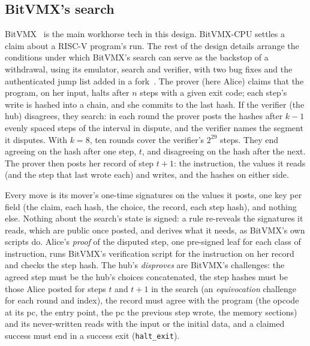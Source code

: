 \documentclass[11pt]{article}
\newcommand{\tx}[1]{\texttt{#1}}
\begin{document}
\subsection{BitVMX's search}
\label{sec:search}

BitVMX~\cite{bitvmx} is the main workhorse tech in this design. BitVMX-CPU settles a claim about a RISC-V program's run. The rest of the design details arrange the conditions
under which BitVMX's search can serve as the backstop of a withdrawal,
using its emulator, search and verifier, with two bug fixes and the authenticated jump list added in a fork~\cite{bitvmxcpu,bitvmxfork}. The prover (here Alice) claims that the program, on her input, halts
after $n$ steps with a given exit code; each step's write is hashed into
a chain, and she commits to the last hash. If the verifier (the hub)
disagrees, they search: in each round the prover posts the hashes after
$k - 1$ evenly spaced steps of the interval in dispute, and the verifier
names the segment it disputes. With $k = 8$, ten rounds cover the
verifier's $2^{29}$ steps. They end agreeing on the hash after one step,
$t$, and disagreeing on the hash after the next. The prover then posts
her record of step $t + 1$: the instruction, the values it reads (and
the step that last wrote each) and writes, and the hashes on either
side.

Every move is its mover's one-time signatures on the values it posts,
one key per field (the claim, each hash, the choice, the record, each
step hash), and nothing else. Nothing about the search's state is
signed: a rule re-reveals the signatures it reads, which are public once
posted, and derives what it needs, as BitVMX's own scripts do. Alice's
\emph{proof} of the disputed step, one pre-signed leaf for each class of
instruction, runs BitVMX's verification script for the instruction on
her record and checks the step hash. The hub's \emph{disproves} are
BitVMX's challenges: the agreed step must be the hub's choices
concatenated, the step hashes must be those Alice posted for steps $t$
and $t + 1$ in the search (an \emph{equivocation} challenge for each
round and index), the record must agree with the program (the opcode at
its pc, the entry point, the pc the previous step wrote, the memory
sections) and its never-written reads with the input or the initial
data, and a claimed success must end in a success exit
(\tx{halt\_exit}).
\end{document}
